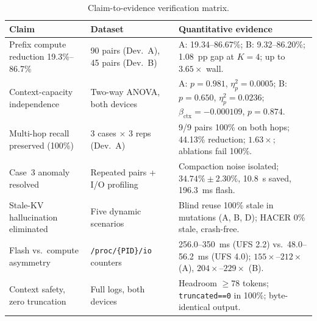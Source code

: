 \documentclass[10pt,conference]{IEEEtran}
\begin{document}
\begin{table}[!htbp]
\centering
\caption{Claim-to-evidence verification matrix.}
\label{tab:claim_matrix}
\scriptsize
\renewcommand{\arraystretch}{0.94}
\begin{tabularx}{\columnwidth}{L{2.1cm}L{2.1cm}Y}
\toprule
\textbf{Claim} & \textbf{Dataset} & \textbf{Quantitative evidence} \\
\midrule
Prefix compute reduction 19.3\%--86.7\% & 90 pairs (Dev.~A), 45 pairs (Dev.~B) & A: 19.34--86.67\%; B: 9.32--86.20\%; 1.08~pp gap at $K{=}4$; up to $3.65\times$ wall. \\
Context-capacity independence & Two-way ANOVA, both devices & A: $p=0.981$, $\eta_p^2=0.0005$; B: $p=0.650$, $\eta_p^2=0.0236$; $\beta_{\text{ctx}}=-0.000109$, $p=0.874$. \\
Multi-hop recall preserved (100\%) & 3 cases $\times$ 3 reps (Dev.~A) & 9/9 pairs 100\% on both hops; 44.13\% reduction; $1.63\times$; ablations fail 100\%. \\
Case~3 anomaly resolved & Repeated pairs + I/O profiling & Compaction noise isolated; $34.74\%\pm2.30\%$, 10.8~s saved, 196.3~ms flash. \\
Stale-KV hallucination eliminated & Five dynamic scenarios & Blind reuse 100\% stale in mutations (A, B, D); HACER 0\% stale, crash-free. \\
Flash vs.\ compute asymmetry & \texttt{/proc/\allowbreak\{PID\}/\allowbreak io} counters & 256.0--350~ms (UFS 2.2) vs.\ 48.0--56.2~ms (UFS 4.0); $155\times$--$212\times$ (A), $204\times$--$229\times$ (B). \\
Context safety, zero truncation & Full logs, both devices & Headroom $\ge78$ tokens; \texttt{truncated==0} in 100\%; byte-identical output. \\
\bottomrule
\end{tabularx}
\end{table}

\end{document}
